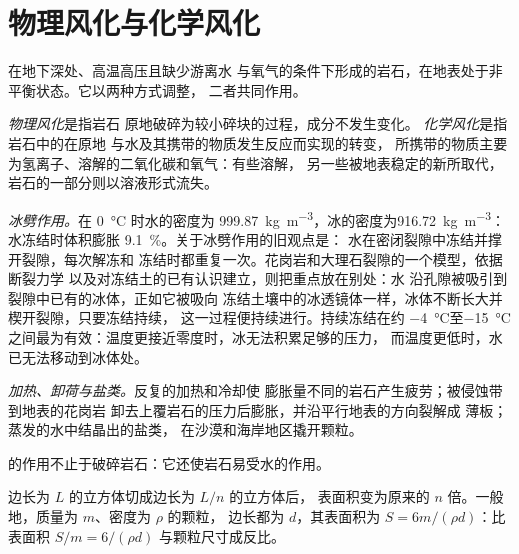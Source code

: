 \section{物理风化与化学风化}\label{sec:b1:weathering-clays:types}

在地下深处、高温高压且缺少游离水
与氧气的条件下形成的岩石，在地表处于非平衡状态。它以两种方式调整，
二者共同作用。

\begin{definition}\label{def:b1:weathering-clays:weathering}
\emph{物理风化}是指岩石
原地破碎为较小碎块的过程，成分不发生变化。
\emph{化学风化}是指岩石中的在原地
与水及其携带的物质发生反应而实现的转变，
所携带的物质主要为氢离子、溶解的二氧化碳和氧气：有些溶解，
另一些被地表稳定的新所取代，
岩石的一部分则以溶液形式流失。
\end{definition}

\emph{冰劈作用。}在 \qty{0}{\celsius} 时水的密度为
\qty{999.87}{kg.m^{-3}}，冰的密度为\qty{916.72}{kg.m^{-3}}：水冻结时体积膨胀
\qty{9.1}{\percent}。关于冰劈作用的旧观点是：
水在密闭裂隙中冻结并撑开裂隙，每次解冻和
冻结时都重复一次。花岗岩和大理石裂隙的一个模型，依据断裂力学
以及对冻结土的已有认识建立，则把重点放在别处：水
沿孔隙被吸引到裂隙中已有的冰体，正如它被吸向
冻结土壤中的冰透镜体一样，冰体不断长大并楔开裂隙，只要冻结持续，
这一过程便持续进行。持续冻结在约
\qty{-4}{\celsius}至\qty{-15}{\celsius}之间最为有效：温度更接近零度时，冰无法积累足够的压力，
而温度更低时，水已无法移动到冰体处。

\emph{加热、卸荷与盐类。}反复的加热和冷却使
膨胀量不同的岩石产生疲劳；被侵蚀带到地表的花岗岩
卸去上覆岩石的压力后膨胀，并沿平行地表的方向裂解成
薄板；蒸发的水中结晶出的盐类，
在沙漠和海岸地区撬开颗粒。

的作用不止于破碎岩石：它还使岩石易受水的作用。

\begin{proposition}[破碎所打开的表面]\label{prop:b1:weathering-clays:surface}
边长为 $L$ 的立方体切成边长为 $L/n$ 的立方体后，
表面积变为原来的 $n$ 倍。一般地，质量为 $m$、密度为 $\rho$ 的颗粒，
边长都为 $d$，其表面积为 $S = 6m/(\rho d)$：比表面积 $S/m =
6/(\rho d)$ 与颗粒尺寸成反比。
\end{proposition}

